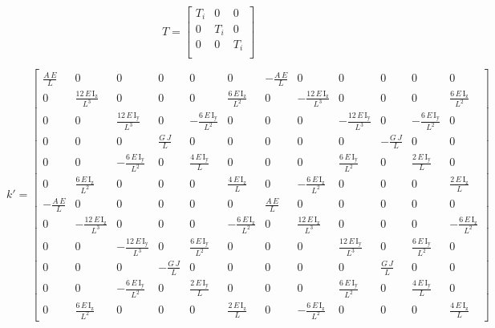 \begin{equation}
    T = \left[ \begin{array}{ccc}
        T_{i} & 0 & 0 \\
        0 & T_{i} & 0 \\
        0 & 0 & T_{i} \\
    \end{array} \right]
\end{equation}

\begin{footnotesize}
\begin{equation}
    k' = \left[\begin{array}{cccccccccccc} \frac{A\, E}{L} & 0 & 0 & 0 & 0 & 0 & -\frac{A\, E}{L} & 0 & 0 & 0 & 0 & 0\\ 0 & \frac{12\, E\, \mathrm{I_z}}{L^3} & 0 & 0 & 0 & \frac{6\, E\, \mathrm{I_z}}{L^2} & 0 & -\frac{12\, E\, \mathrm{I_z}}{L^3} & 0 & 0 & 0 & \frac{6\, E\, \mathrm{I_z}}{L^2}\\ 0 & 0 & \frac{12\, E\, \mathrm{I_y}}{L^3} & 0 & -\frac{6\, E\, \mathrm{I_y}}{L^2} & 0 & 0 & 0 & -\frac{12\, E\, \mathrm{I_y}}{L^3} & 0 & -\frac{6\, E\, \mathrm{I_y}}{L^2} & 0\\ 0 & 0 & 0 & \frac{G\, J}{L} & 0 & 0 & 0 & 0 & 0 & -\frac{G\, J}{L} & 0 & 0\\ 0 & 0 & -\frac{6\, E\, \mathrm{I_y}}{L^2} & 0 & \frac{4\, E\, \mathrm{I_y}}{L} & 0 & 0 & 0 & \frac{6\, E\, \mathrm{I_y}}{L^2} & 0 & \frac{2\, E\, \mathrm{I_y}}{L} & 0\\ 0 & \frac{6\, E\, \mathrm{I_z}}{L^2} & 0 & 0 & 0 & \frac{4\, E\, \mathrm{I_z}}{L} & 0 & -\frac{6\, E\, \mathrm{I_z}}{L^2} & 0 & 0 & 0 & \frac{2\, E\, \mathrm{I_z}}{L}\\ -\frac{A\, E}{L} & 0 & 0 & 0 & 0 & 0 & \frac{A\, E}{L} & 0 & 0 & 0 & 0 & 0\\ 0 & -\frac{12\, E\, \mathrm{I_z}}{L^3} & 0 & 0 & 0 & -\frac{6\, E\, \mathrm{I_z}}{L^2} & 0 & \frac{12\, E\, \mathrm{I_z}}{L^3} & 0 & 0 & 0 & -\frac{6\, E\, \mathrm{I_z}}{L^2}\\ 0 & 0 & -\frac{12\, E\, \mathrm{I_y}}{L^3} & 0 & \frac{6\, E\, \mathrm{I_y}}{L^2} & 0 & 0 & 0 & \frac{12\, E\, \mathrm{I_y}}{L^3} & 0 & \frac{6\, E\, \mathrm{I_y}}{L^2} & 0\\ 0 & 0 & 0 & -\frac{G\, J}{L} & 0 & 0 & 0 & 0 & 0 & \frac{G\, J}{L} & 0 & 0\\ 0 & 0 & -\frac{6\, E\, \mathrm{I_y}}{L^2} & 0 & \frac{2\, E\, \mathrm{I_y}}{L} & 0 & 0 & 0 & \frac{6\, E\, \mathrm{I_y}}{L^2} & 0 & \frac{4\, E\, \mathrm{I_y}}{L} & 0\\ 0 & \frac{6\, E\, \mathrm{I_z}}{L^2} & 0 & 0 & 0 & \frac{2\, E\, \mathrm{I_z}}{L} & 0 & -\frac{6\, E\, \mathrm{I_z}}{L^2} & 0 & 0 & 0 & \frac{4\, E\, \mathrm{I_z}}{L} \end{array}\right]
\end{equation}
\end{footnotesize}

